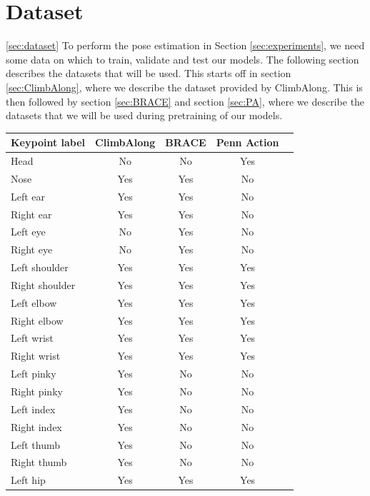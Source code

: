 \documentclass[./main.tex]{subfiles}
\begin{document}
\section{Dataset}
\ref{sec:dataset}
To perform the pose estimation in Section \ref{sec:experiments}, we need some data on which to train, validate and test our models. The following section describes the datasets that will be used. This starts off in section \ref{sec:ClimbAlong}, where we describe the dataset provided by ClimbAlong. This is then followed by section \ref{sec:BRACE} and section \ref{sec:PA}, where we describe the datasets that we will be used during pretraining of our models.

\begin{table}[htbp]
    \begin{tabular}{|l|c|c|c|c|}
        \hline
        \textbf{Keypoint label} & \textbf{ClimbAlong} & \textbf{BRACE} & \textbf{Penn Action} \\ \hline
        Head & No & No & Yes \\ \hline
        Nose & Yes & Yes & No \\ \hline
        Left ear & Yes & Yes & No \\ \hline
        Right ear & Yes & Yes & No \\ \hline
        Left eye & No & Yes & No \\ \hline
        Right eye & No & Yes & No \\ \hline
        Left shoulder & Yes & Yes & Yes \\ \hline
        Right shoulder & Yes & Yes & Yes \\ \hline
        Left elbow & Yes & Yes & Yes \\ \hline
        Right elbow & Yes & Yes & Yes \\ \hline
        Left wrist & Yes & Yes & Yes \\ \hline
        Right wrist & Yes & Yes & Yes \\ \hline
        Left pinky & Yes & No & No \\ \hline
        Right pinky & Yes & No & No \\ \hline
        Left index & Yes & No & No \\ \hline
        Right index & Yes & No & No \\ \hline
        Left thumb & Yes & No & No \\ \hline
        Right thumb & Yes & No & No \\ \hline
        Left hip & Yes & Yes & Yes \\ \hline

\end{tabular}
\end{table}
\end{document}
